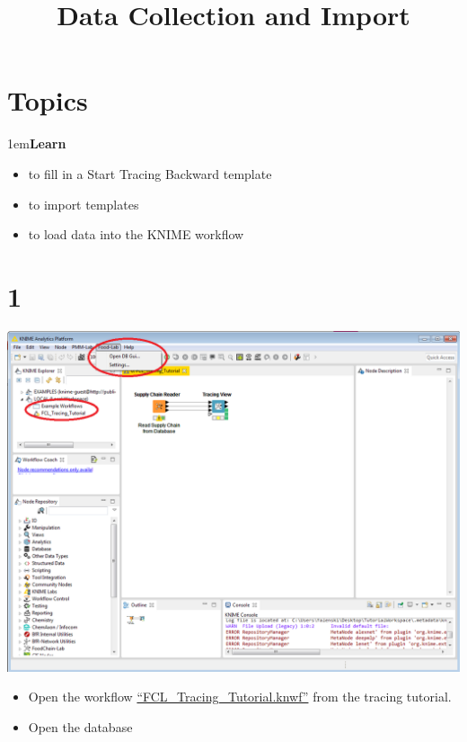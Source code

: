 \documentclass[10pt]{beamer}
\title{Data Collection and Import}
\date{}
\begin{document}
\maketitle

\section{Topics}
\begin{frame}
\leftskip1em\textbf{Learn}
	\begin{itemize}
		\item to fill in a Start Tracing Backward template
    \item to import templates
    \item to load data into the KNIME workflow
	\end{itemize}
\end{frame}

\section{1}
\begin{frame}
	\begin{center}
		\includegraphics[height=0.6\textheight]{1.png}
	\end{center}
	\begin{itemize}
		\item Open the workflow \href{https://github.com/SiLeBAT/BfROpenLabResources/raw/master/GitHubPages/workflows/FCL_Tracing_Tutorial.knwf}{``FCL\_Tracing\_Tutorial.knwf''} from the tracing tutorial.
    \item Open the database
	\end{itemize}
\end{frame}
\end{document}
